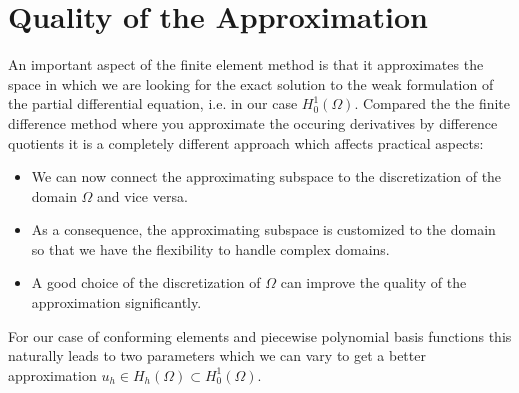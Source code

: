 \documentclass[a4paper, 11pt, twoside]{article}
\begin{document}
\section{Quality of the Approximation}
An important aspect of the finite element method is that it approximates the space in which we are looking for the exact solution to the weak formulation of the partial differential equation, i.e. in our case $H_0^1(\Omega)$. Compared the the finite difference method where you approximate the occuring derivatives by difference quotients it is a completely different approach which affects practical aspects:
\begin{itemize}
\item We can now connect the approximating subspace to the discretization of the domain $\Omega$ and vice versa.
\item As a consequence, the approximating subspace is customized to the domain so that we have the flexibility to handle complex domains.
\item A good choice of the discretization of $\Omega$ can improve the quality of the approximation significantly.
\end{itemize}

For our case of conforming elements and piecewise polynomial basis functions this naturally leads to two parameters which we can vary to get a better approximation $u_h \in H_h(\Omega)\subset H^1_0(\Omega)$.
\end{document}

